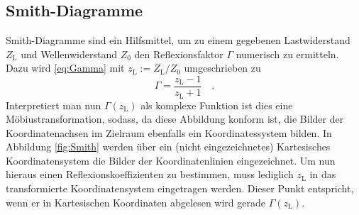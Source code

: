 \subsection{Smith-Diagramme}
Smith-Diagramme sind ein Hilfsmittel, um zu einem gegebenen Lastwiderstand 
$Z_\text{L}$ und Wellenwiderstand $Z_0$ den Reflexionsfaktor $\Gamma$ numerisch 
zu ermitteln. Dazu wird \eqref{eq:Gamma} mit $z_\text{L}:=Z_\text{L}/Z_0$ 
umgeschrieben zu
\begin{equation}
\Gamma = \frac{z_\text{L}-1}{z_\text{L}+1} \quad .
\end{equation}
Interpretiert man nun $\Gamma(z_\text{L})$ als komplexe Funktion ist dies eine 
Möbiustransformation, sodass, da diese Abbildung konform ist, die Bilder der 
Koordinatenachsen im Zielraum ebenfalls ein Koordinatessystem bilden. In Abbildung 
\ref{fig:Smith} werden über ein (nicht eingezeichnetes) Kartesisches 
Koordinatensystem die Bilder der Koordinatenlinien eingezeichnet. Um nun hieraus 
einen Reflexionskoeffizienten zu bestimmen, muss lediglich $z_\text{L}$ in das 
transformierte Koordinatensystem eingetragen werden. Dieser Punkt entspricht, wenn 
er in Kartesischen Koordinaten abgelesen wird gerade $\Gamma(z_\text{L})$.

